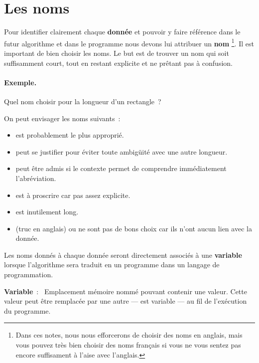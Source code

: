 	\section{Les noms}
	
		Pour identifier clairement chaque \textbf{donnée}
		et pouvoir y faire référence dans le futur algorithme
		et dans le programme
		nous devons lui attribuer un \textbf{nom}%
		\footnote{%
				Dans ces notes, nous nous efforcerons de choisir des noms en 
				anglais,
				mais vous pouvez très bien choisir
				des noms français si vous ne vous sentez pas encore suffisament 
				à l'aise avec l'anglais.
		}.
		Il est important de bien choisir les noms. 
		Le but est de trouver un nom qui soit suffisamment court,
		tout en restant explicite et ne prêtant pas à confusion.
		
	
		\begin{Emphase}
			\paragraph{Exemple.}	
			Quel nom choisir pour la longueur d’un rectangle~?
	
			On peut envisager les noms suivants~:
			\begin{itemize}
			\item
				 est probablement le plus approprié.
			\item
				 peut se justifier
				pour éviter toute ambigüité avec une autre longueur.
			\item
				 peut être admis
				si le contexte permet de comprendre immédiatement
				l’abréviation.
			\item
				 est à proscrire car pas assez explicite.
			\item
				 est inutilement long. 
			\item
				 (truc en anglais) ou  ne sont pas de bons choix
				car ils n’ont aucun lien avec la donnée.
			\end{itemize}
		\end{Emphase}

		Les noms donnés à chaque donnée seront directement associés à une 
		\textbf{variable} lorsque l'algorithme sera traduit en un programme dans 
		un langage de programmation. 
		
		 \textbf{Variable}~:~ Emplacement
		mémoire nommé pouvant contenir une valeur. Cette valeur peut être
		remplacée par une autre — est variable — au fil de l'exécution du
		programme. 
		
